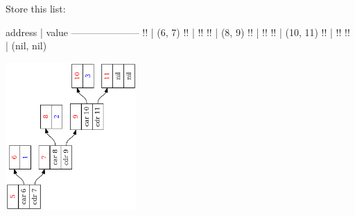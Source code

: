 \documentclass[professionalFonts]{beamer}
\makeatletter
\newcommand\pythonstyle{\lstset{
xleftmargin=1em,
framextopmargin=2em,
framexbottommargin=2em,
showspaces=false,
showtabs=false,
showstringspaces=false,
tabsize=4,
basicstyle=\ttfamily\small\setstretch{1},
backgroundcolor=\color{Background},
language=python,
commentstyle=\color{Comments}\slshape,
stringstyle=\color{Strings},
morecomment=[s][\color{Strings}]{"""}{"""},
morecomment=[s][\color{Strings}]{'''}{'''},
morekeywords={import,from,class,def,for,while,if,is,in,elif,else,not,and,or,print,break,continue,return,True,False,None,access,as,,del,except,exec,finally,global,import,lambda,pass,print,raise,try,assert},
keywordstyle={\color{Keywords}\bfseries},
morekeywords={[2]@invariant},
keywordstyle={[2]\color{Decorators}\slshape},
emph={self},
emphstyle={\color{self}\slshape},
%
}}
\newcommand\pythoninline[1]{{\pythonstyle\lstinline!#1!}}
\makeatother
\begin{document}
\begin{frame}[fragile]


Store this list: 
\begin{python}[escapechar=!]
[!\color{blue}{1}!, !\color{blue}{2}!, !\color{blue}{3}!]
\end{python}

\begin{python}[escapechar=!]
address | value
---------------------
!\color{red}{5}!       | (6, 7)
!\color{red}{6}!       | !\color{blue}{1}!
!\color{red}{7}!       | (8, 9)
!\color{red}{8}!       | !\color{blue}{2}!
!\color{red}{9}!       | (10, 11)
!\color{red}{10}!      | !\color{blue}{3}!
!\color{red}{11}!      | (nil, nil)
\end{python}


\vspace{-3cm}
\begin{center}
\hspace{3cm}\includegraphics[angle=-90,origin=c,width=5cm]{list123.pdf}
\end{center}


\end{frame}
\end{document}

